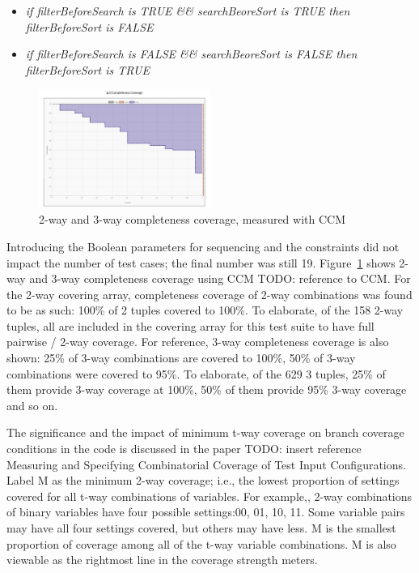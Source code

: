 \documentclass[conference]{IEEEtran}
\newcommand{\todo}[1]{}
\renewcommand{\todo}[1]{{\color{red} TODO: {#1}}}
\begin{document}
	\begin{itemize}
	\item \textit{if filterBeforeSearch is TRUE \&\& searchBeoreSort is TRUE then filterBeforeSort is FALSE}
	\item \textit{if filterBeforeSearch is FALSE \&\& searchBeoreSort is FALSE then filterBeforeSort is TRUE}
	\end{itemize}


	\begin{figure}[!h]
		\includegraphics[width=0.50\textwidth,]{CompletenessCoverage.pdf}
		\caption{2-way and 3-way completeness coverage, measured with CCM}
		\label{fig:CompletenessCoverage}
	\end{figure}


	Introducing the Boolean parameters for sequencing and the constraints did not impact the number of test cases; the final number was still 19.
	Figure~\ref{fig:CompletenessCoverage} shows 2-way and 3-way completeness coverage using CCM \todo{reference to CCM}. 
	For the 2-way covering array, completeness coverage of 2-way combinations was found to be as such: 100\% of 2 tuples covered to 100\%. 
	To elaborate, of the 158 2-way tuples, all are included in the covering array for this test suite to have full pairwise / 2-way coverage.
	For reference, 3-way completeness coverage is also shown: 25\% of 3-way combinations are covered to 100\%, 50\% of 3-way combinations were covered to 95\%.
	To elaborate, of the 629 3 tuples, 25\% of them provide 3-way coverage at 100\%, 50\% of them provide 95\% 3-way coverage and so on.

	The significance and the impact of minimum t-way coverage on branch coverage conditions in the code is discussed in the paper \todo{insert reference} Measuring and Specifying Combinatorial Coverage of Test Input Configurations.
	Label M as the minimum 2-way coverage; i.e., the lowest proportion of settings covered for all t-way combinations of variables.
	For example,, 2-way combinations of binary variables have four possible settings:00, 01, 10, 11.
	Some variable pairs may have all four settings covered, but others may have less.
	M is the smallest proportion of coverage among all of the t-way variable combinations.
	M is also viewable as the rightmost line in the coverage strength meters.
\end{document}
